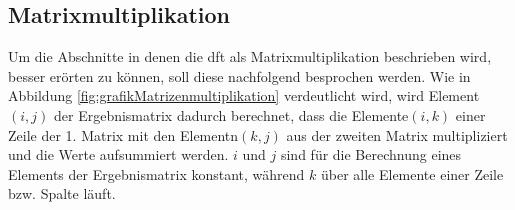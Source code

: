 \subsection{Matrixmultiplikation}\label{sec:Matrixmultiplikation}

% 
% 
% 
 
 


Um die Abschnitte in denen die \gls{dft} als Matrixmultiplikation beschrieben wird, besser erörten zu können, soll diese nachfolgend besprochen werden.
Wie in Abbildung \ref{fig:grafikMatrizenmultiplikation} verdeutlicht wird, wird Element$(i,j)$ der Ergebnismatrix dadurch berechnet, dass die Elemente$(i,k)$ einer Zeile der 1. Matrix
mit den Elementn$(k,j)$ aus der zweiten Matrix multipliziert und die Werte aufsummiert werden. $i$ und $j$ sind für die Berechnung eines Elements der Ergebnismatrix konstant, während $k$ über alle
Elemente einer Zeile bzw. Spalte läuft.

